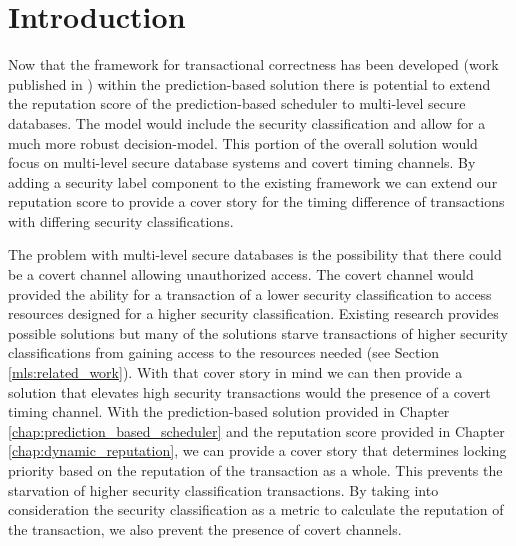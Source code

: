 \section{Introduction}
\label{mls:introduction}

Now that the framework for transactional correctness has been developed (work published in \cite{ravan_ensuring_2020}) within the prediction-based solution there is potential to extend the reputation score of the prediction-based scheduler to multi-level secure databases. The model would include the security classification and allow for a much more robust decision-model. This portion of the overall solution would focus on multi-level secure database systems and covert timing channels. By adding a security label component to the existing framework we can extend our reputation score to provide a cover story for the timing difference of transactions with differing security classifications. 

The problem with multi-level secure databases is the possibility that there could be a covert channel allowing unauthorized access. The covert channel would provided the ability for a transaction of a lower security classification to access resources designed for a higher security classification. Existing research provides possible solutions but many of the solutions starve transactions of higher security classifications from gaining access to the resources needed (see Section \ref{mls:related_work}). With that cover story in mind we can then provide a solution that elevates high security transactions would the presence of a covert timing channel. With the prediction-based solution provided in Chapter \ref{chap:prediction_based_scheduler} and the reputation score provided in Chapter \ref{chap:dynamic_reputation}, we can provide a cover story that determines locking priority based on the reputation of the transaction as a whole. This prevents the starvation of higher security classification transactions. By taking into consideration the security classification as a metric to calculate the reputation of the transaction, we also prevent the presence of covert channels. 